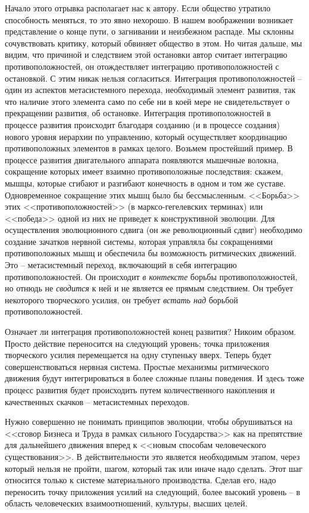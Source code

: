 \documentclass{book}
\begin{document}
Начало этого отрывка располагает нас к автору. Если обще­ство утратило способность меняться, то это явно нехорошо. В нашем воображении возникает представление о конце пути, о загнивании и неизбежном распаде. Мы склонны сочувство­вать критику, который обвиняет общество в этом. Но читая дальше, мы видим, что причиной и следствием этой остановки автор считает интеграцию противоположностей, он отождест­вляет интеграцию противоположностей с остановкой. С этим никак нельзя согласиться. Интеграция противоположностей -- один из аспектов метасистемного перехода, необходимый эле­мент развития, так что наличие этого элемента само по себе ни в коей мере не свидетельствует о прекращении развития, об остановке. Интеграция противоположностей в процессе раз­вития происходит благодаря созданию (и в процессе создания) нового уровня иерархии по управлению, который осуществля­ет координацию противоположных элементов в рамках целого. Возьмем простейший пример. В процессе развития двигатель­ного аппарата появляются мышечные 
волокна, сокращение ко­торых имеет взаимно противоположные последствия: скажем, мышцы, которые сгибают и разгибают конечность в одном и том же суставе. Одновременное сокращение этих мышц было бы бессмысленным. <<Борьба>> этих <<противоположностей>> (в марксо-гегелевских терминах) или <<победа>> одной из них не приведет к конструктивной эволюции. Для осуществления эволюционного сдвига (он же революционный сдвиг) необхо­димо создание зачатков нервной системы, которая управляла бы сокращениями противоположных мышц и обеспечила бы возможность ритмических движений. Это -- метасистемный переход, включающий в себя интеграцию противоположностей. Он происходит \textit{в контексте}  борьбы противоположностей, но отнюдь не \textit{сводится}  к ней и не является ее прямым следствием. Он требует некоторого творческого усилия, он требует \textit{встать над}  борьбой противоположностей.

Означает ли интеграция противоположностей конец разви­тия? Никоим образом. Просто действие переносится на следу­ющий уровень; точка приложения творческого усилия переме­щается на одну ступеньку вверх. Теперь будет совершенство­ваться нервная система. Простые механизмы ритмического движения будут интегрироваться в более сложные планы по­ведения. И здесь тоже процесс развития будет происходить пу­тем количественного накопления и качественных скачков -- метасистемных переходов.

Нужно совершенно не понимать принципов эволюции, что­бы обрушиваться на <<сговор Бизнеса и Труда в рамках силь­ного Государства>> как на препятствие для дальнейшего дви­жения вперед к <<новым способам человеческого существова­ния>>. В действительности это является необходимым этапом, через который нельзя не пройти, шагом, который так или ина­че надо сделать. Этот шаг относится только к системе матери­ального производства. Сделав его, надо переносить точку при­ложения усилий на следующий, более высокий уровень -- в об­ласть человеческих взаимоотношений, культуры, высших целей.
\end{document}
